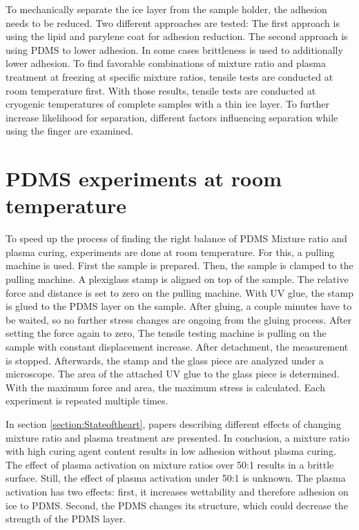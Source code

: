 
To mechanically separate the ice layer from the sample holder, the adhesion needs to be reduced. Two different approaches are tested: The first approach is using the lipid and parylene coat for adhesion reduction. The second approach is using PDMS to lower adhesion. In some cases brittleness is used to additionally lower adhesion. To find favorable combinations of mixture ratio and plasma treatment at freezing at specific mixture ratios, tensile tests are conducted at room temperature first. With those results, tensile tests are conducted at cryogenic temperatures of complete samples with a thin ice layer. To further increase likelihood for separation, different factors influencing separation while using the finger are examined.

\section{PDMS experiments at room temperature}

To speed up the process of finding the right balance of PDMS Mixture ratio and plasma curing, experiments are done at room temperature. For this, a pulling machine is used. First the sample is prepared. Then, the sample is clamped to the pulling machine. A plexiglass stamp is aligned on top of the sample. The relative force and distance is set to zero on the pulling machine. With UV glue, the stamp is glued to the PDMS layer on the sample. After gluing, a couple minutes have to be waited, so no further stress changes are ongoing from the gluing process. After setting the force again to zero, The tensile testing machine is pulling on the sample with constant displacement increase. After detachment, the measurement is stopped. Afterwards, the stamp and the glass piece are analyzed under a microscope. The area of the attached UV glue to the glass piece is determined. With the maximum force and area, the maximum stress is calculated. Each experiment is repeated multiple times.

In section \ref{section:Stateoftheart}, papers describing different effects of changing mixture ratio and plasma treatment are presented. In conclusion, a mixture ratio with high curing agent content results in low adhesion without plasma curing. The effect of plasma activation on mixture ratios over 50:1 results in a brittle surface. Still, the effect of plasma activation under 50:1 is unknown. The plasma activation has two effects: first, it increases wettability and therefore adhesion on ice to PDMS. Second, the PDMS changes its structure, which could decrease the strength of the PDMS layer.

